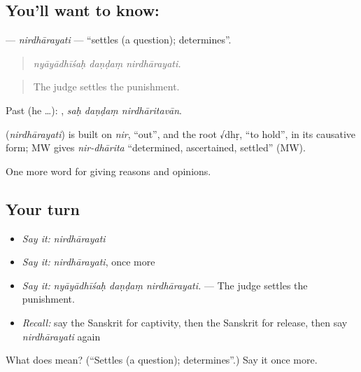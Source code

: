 \subsection*{You'll want to know: }
\textbf{} — \emph{nirdhārayati} — \textquotedblleft{}settles (a question); determines\textquotedblright{}.

\begin{quote}
  
\end{quote}

\begin{quote}
\emph{nyāyādhīśaḥ daṇḍaṃ nirdhārayati.}
\end{quote}

\begin{quote}
The judge settles the punishment.
\end{quote}

Past (he …):   , \emph{saḥ daṇḍaṃ nirdhāritavān}.

\begin{cousinweb}
\textbf{} (\emph{nirdhārayati}) is built on \emph{nir}, \textquotedblleft{}out\textquotedblright{}, and the root √dhṛ, \textquotedblleft{}to hold\textquotedblright{}, in its causative form; MW gives \emph{nir-dhārita} \textquotedblleft{}determined, ascertained, settled\textquotedblright{} (MW).
\end{cousinweb}

\begin{grammarlens}[title={What you've built}]
One more word for giving reasons and opinions.
\end{grammarlens}

\subsection*{Your turn}
\begin{itemize}
\raggedright
  \item \emph{Say it:} \emph{nirdhārayati}
  \item \emph{Say it:} \emph{nirdhārayati}, once more
  \item \emph{Say it:} \emph{nyāyādhīśaḥ daṇḍaṃ nirdhārayati.} — The judge settles the punishment.
  \item \emph{Recall:} say the Sanskrit for captivity, then the Sanskrit for release, then say \emph{nirdhārayati} again
\end{itemize}

\begin{tcolorbox}[breakable,colback=teal!4,colframe=teal!35!black,title={Before you move on}]
What does  mean? (\textquotedblleft{}Settles (a question); determines\textquotedblright{}.) Say it once more.
\end{tcolorbox}
